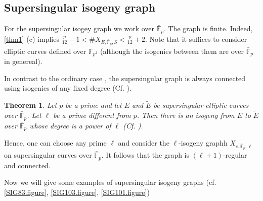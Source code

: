 \documentclass{article}
\theoremstyle{theorem}
\newtheorem{theorem}{Theorem}
\theoremstyle{definition}
\begin{document}
\subsection{Supersingular isogeny graph}

For the supersingular isogey graph we work over $\bar{\mathbb{F}}_p$. The graph is finite. Indeed, \cref{thm1} (c) implies $\frac{p}{12} - 1 < \#X_{E, \bar{\mathbb{F}}_p, S} < \frac{p}{12} + 2$. Note that it suffices to consider elliptic curves defined over $\mathbb{F}_{p^2}$ (although the isogenies between them are over $\bar{\mathbb{F}}_p$ in genereal).

In contrast to the ordinary case , the supersingular graph is always connected using isogenies of any fixed degree (Cf. \cite[2.4]{Mestre}).

\begin{theorem}
	Let $p$ be a prime and let $E$ and $\tilde{E}$ be supersingular elliptic curves over $\bar{\mathbb{F}}_p$. Let $\ell$ be a prime different from $p$. Then there is an isogeny from $E$ to $\tilde{E}$ over $\bar{\mathbb{F}}_p$ whose degree is a power of $\ell$ (Cf. \cite[2.4]{Mestre}).
\end{theorem}

Hence, one can choose any prime $\ell$ and consider the $\ell$-isogeny graphh $X_{e,\bar{\mathbb{F}}_p, {\ell}}$ on supersingular curves over $\bar{\mathbb{F}}_p$. It follows that the graph is $(\ell + 1)$-regular and connected.

Now we will give some examples of supersingular isogeny graphs (cf. \cref{SIG83.figure}, \cref{SIG103.figure}, \cref{SIG101.figure})
\end{document}
